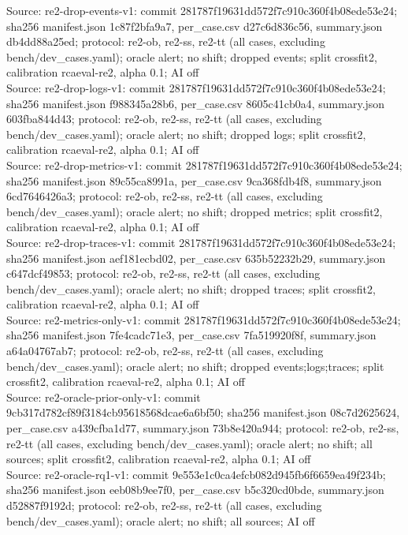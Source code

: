 \begin{table}[t]
Source: re2-drop-events-v1: commit 281787f19631dd572f7c910c360f4b08ede53e24; sha256 manifest.json 1c87f2bfa9a7, per\_case.csv d27c6d836c56, summary.json db4dd88a25ed; protocol: re2-ob, re2-ss, re2-tt (all cases, excluding bench/dev\_cases.yaml); oracle alert; no shift; dropped events; split crossfit2, calibration rcaeval-re2, alpha 0.1; AI off\\
Source: re2-drop-logs-v1: commit 281787f19631dd572f7c910c360f4b08ede53e24; sha256 manifest.json f988345a28b6, per\_case.csv 8605c41cb0a4, summary.json 603fba844d43; protocol: re2-ob, re2-ss, re2-tt (all cases, excluding bench/dev\_cases.yaml); oracle alert; no shift; dropped logs; split crossfit2, calibration rcaeval-re2, alpha 0.1; AI off\\
Source: re2-drop-metrics-v1: commit 281787f19631dd572f7c910c360f4b08ede53e24; sha256 manifest.json 89c55ca8991a, per\_case.csv 9ca368fdb4f8, summary.json 6cd7646426a3; protocol: re2-ob, re2-ss, re2-tt (all cases, excluding bench/dev\_cases.yaml); oracle alert; no shift; dropped metrics; split crossfit2, calibration rcaeval-re2, alpha 0.1; AI off\\
Source: re2-drop-traces-v1: commit 281787f19631dd572f7c910c360f4b08ede53e24; sha256 manifest.json aef181ecbd02, per\_case.csv 635b52232b29, summary.json c647dcf49853; protocol: re2-ob, re2-ss, re2-tt (all cases, excluding bench/dev\_cases.yaml); oracle alert; no shift; dropped traces; split crossfit2, calibration rcaeval-re2, alpha 0.1; AI off\\
Source: re2-metrics-only-v1: commit 281787f19631dd572f7c910c360f4b08ede53e24; sha256 manifest.json 7fe4cadc71e3, per\_case.csv 7fa519920f8f, summary.json a64a04767ab7; protocol: re2-ob, re2-ss, re2-tt (all cases, excluding bench/dev\_cases.yaml); oracle alert; no shift; dropped events;logs;traces; split crossfit2, calibration rcaeval-re2, alpha 0.1; AI off\\
Source: re2-oracle-prior-only-v1: commit 9cb317d782cf89f3184cb95618568dcae6a6bf50; sha256 manifest.json 08c7d2625624, per\_case.csv a439cfba1d77, summary.json 73b8e420a944; protocol: re2-ob, re2-ss, re2-tt (all cases, excluding bench/dev\_cases.yaml); oracle alert; no shift; all sources; split crossfit2, calibration rcaeval-re2, alpha 0.1; AI off\\
Source: re2-oracle-rq1-v1: commit 9e553e1c0ca4efcb082d945fb6f6659ea49f234b; sha256 manifest.json eeb08b9ee7f0, per\_case.csv b5c320cd0bde, summary.json d52887f9192d; protocol: re2-ob, re2-ss, re2-tt (all cases, excluding bench/dev\_cases.yaml); oracle alert; no shift; all sources; AI off\\

\end{table}
